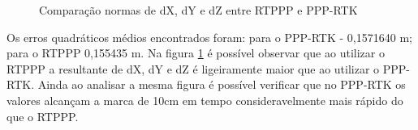 \begin{figure}[H]
\centering
{}
\caption{Comparação normas de dX, dY e dZ entre RTPPP e PPP-RTK}
\label{comparacao_xyz}
\end{figure}

Os erros quadráticos médios encontrados foram: para o PPP-RTK - 0,1571640 m; para o RTPPP 0,155435 m. Na figura \ref{comparacao_xyz} é possível observar que ao utilizar o RTPPP a resultante de dX, dY e dZ é ligeiramente maior que ao utilizar o PPP-RTK. Ainda ao analisar a mesma figura é possível verificar que no PPP-RTK os valores alcançam a marca de 10cm em tempo consideravelmente mais rápido do que o RTPPP.

